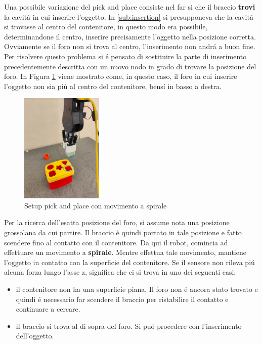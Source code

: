 Una possibile variazione del pick and place consiste nel far si che il braccio \textbf{trovi} la cavit\'{a} in cui inserire l'oggetto. 
In \ref{sub:insertion} si presupponeva che la cavit\'{a} si trovasse al centro del contenitore, in questo modo era possibile, 
determinandone il centro, inserire precisamente l'oggetto nella posizione corretta. Ovviamente se il foro non si trova al centro, 
l'inserimento non andr\'{a} a buon fine. Per risolvere questo problema si \'{e} pensato di sostituire la parte di inserimento 
precedentemente descritta con un nuovo nodo in grado di trovare la posizione del foro\footnotemark{}. 
In Figura \ref{fig:spiral_pick_place} viene mostrato come, in questo caso, il foro in cui inserire l'oggetto non sia pi\'{u} al centro 
del contenitore, bens\'{i} in basso a destra. 
\newpage
\begin{figure}[H]
    \centering
    \includegraphics*[width=0.35\textwidth]{images/spiral_pick_place.jpg}
    \caption{Setup pick and place con movimento a spirale}
    \label{fig:spiral_pick_place}
\end{figure}
Per la ricerca dell'esatta posizione del foro, si assume nota una posizione grossolana da cui partire. 
Il braccio è quindi portato in tale posizione e fatto scendere fino al contatto con il contenitore.
Da qui il robot, comincia ad effettuare un movimento a \textbf{spirale}. 
Mentre effettua tale movimento, mantiene l'oggetto in contatto con la superficie del contenitore. Se il sensore 
non rileva pi\'{u} alcuna forza lungo l'asse z, significa che ci si trova in uno dei seguenti casi:
\begin{itemize}
    \item il contenitore non ha una superficie piana. Il foro non \'{e} ancora stato trovato e quindi \'{e} necessario far scendere 
    il braccio per ristabilire il contatto e continuare a cercare.
    \item il braccio si trova al di sopra del foro. Si pu\'{o} procedere con l'inserimento dell'oggetto.
\end{itemize} 
